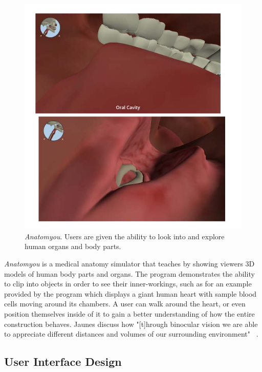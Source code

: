 \documentclass[10pt,twocolumn,letterpaper]{article}
\begin{document}
\begin{figure}[t]
\begin{center}
\includegraphics[width=1.0\linewidth]{images/anatomyou.jpg}
\end{center}
   \caption{\textit{Anatomyou}.  Users are given the ability to look into and explore human organs and body parts. }
\label{fig:long}
\label{fig:onecol}
\end{figure}

\textit{Anatomyou} is a medical anatomy simulator that teaches by showing viewers 3D models of human body parts and organs. The program demonstrates the ability to clip into objects in order to see their inner-workings, such as for an example provided by the program which displays a giant human heart with sample blood cells moving around its chambers. A user can walk around the heart, or even position themselves inside of it to gain a better understanding of how the entire construction behaves. Jaunes \etal discuss how "[t]hrough binocular vision we are able to appreciate different distances and volumes of our surrounding environment" ~\cite{Juanes:2016:IVA:3012430.3012559}.

\subsection{User Interface Design}
\end{document}
